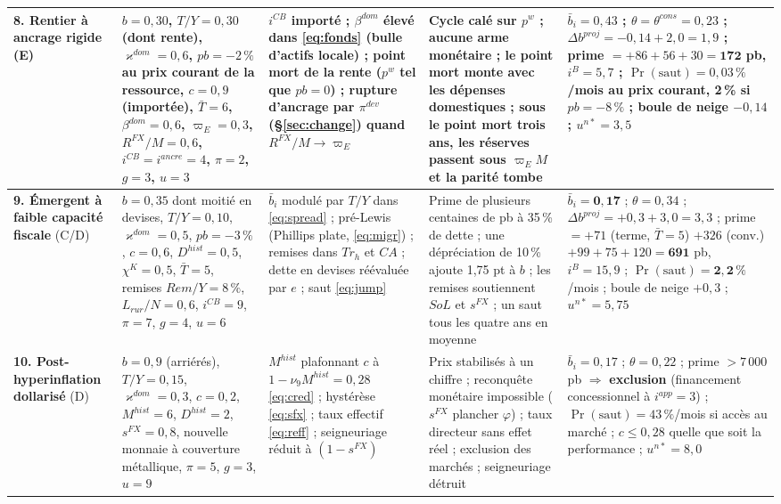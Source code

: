 \documentclass[11pt,a4paper]{article}
\begin{document}
\begin{center}
\begin{longtable}{p{1.6cm}p{3.1cm}p{3.4cm}p{2.9cm}p{3.5cm}}
\midrule
\textbf{8. Rentier à ancrage rigide} (E) & $b=0{,}30$, $T/Y=0{,}30$ (dont rente), $\varkappa^{dom}=0{,}6$, $pb=-2\,\%$ au prix courant de la ressource, $c=0{,}9$ (importée), $\bar T=6$, $\beta^{dom}=0{,}6$, $\varpi_E=0{,}3$, $R^{FX}/M=0{,}6$, $i^{CB}=i^{ancre}=4$, $\pi=2$, $g=3$, $u=3$ & $i^{CB}$ importé ; $\beta^{dom}$ élevé dans \eqref{eq:fonds} (bulle d'actifs locale) ; point mort de la rente ($p^w$ tel que $pb=0$) ; rupture d'ancrage par $\pi^{dev}$ (\S\ref{sec:change}) quand $R^{FX}/M\to\varpi_E$ & Cycle calé sur $p^w$ ; aucune arme monétaire ; le point mort monte avec les dépenses domestiques ; sous le point mort trois ans, les réserves passent sous $\varpi_E M$ et la parité tombe & $\bar b_i=0{,}43$ ; $\theta=\theta^{cons}=0{,}23$ ; $\Delta b^{proj}=-0{,}14+2{,}0=1{,}9$ ; prime $=+86+56+30=\mathbf{172}$ pb, $i^B=5{,}7$ ; $\Pr(\text{saut})=0{,}03\,\%$/mois au prix courant, 2\,\% si $pb=-8\,\%$ ; boule de neige $-0{,}14$ ; $u^{n\ast}=3{,}5$\\
\midrule
\textbf{9. Émergent à faible capacité fiscale} (C/D) & $b=0{,}35$ dont moitié en devises, $T/Y=0{,}10$, $\varkappa^{dom}=0{,}5$, $pb=-3\,\%$, $c=0{,}6$, $D^{hist}=0{,}5$, $\chi^K=0{,}5$, $\bar T=5$, remises $Rem/Y=8\,\%$, $L_{rur}/N=0{,}6$, $i^{CB}=9$, $\pi=7$, $g=4$, $u=6$ & $\bar b_i$ modulé par $T/Y$ dans \eqref{eq:spread} ; pré-Lewis (Phillips plate, \eqref{eq:migr}) ; remises dans $Tr_h$ et $CA$ ; dette en devises réévaluée par $e$ ; saut \eqref{eq:jump} & Prime de plusieurs centaines de pb à 35\,\% de dette ; une dépréciation de 10\,\% ajoute 1,75 pt à $b$ ; les remises soutiennent $SoL$ et $s^{FX}$ ; un saut tous les quatre ans en moyenne & $\bar b_i=\mathbf{0{,}17}$ ; $\theta=0{,}34$ ; $\Delta b^{proj}=+0{,}3+3{,}0=3{,}3$ ; prime $=+71$ (terme, $\bar T=5$) $+326$ (conv.) $+99+75+120=\mathbf{691}$ pb, $i^B=15{,}9$ ; $\Pr(\text{saut})=\mathbf{2{,}2\,\%}$/mois ; boule de neige $+0{,}3$ ; $u^{n\ast}=5{,}75$\\
\midrule
\textbf{10. Post-hyper\-inflation dollarisé} (D) & $b=0{,}9$ (arriérés), $T/Y=0{,}15$, $\varkappa^{dom}=0{,}3$, $c=0{,}2$, $M^{hist}=6$, $D^{hist}=2$, $s^{FX}=0{,}8$, nouvelle monnaie à couverture métallique, $\pi=5$, $g=3$, $u=9$ & $M^{hist}$ plafonnant $c$ à $1-\nu_9M^{hist}=0{,}28$ \eqref{eq:cred} ; hystérèse \eqref{eq:sfx} ; taux effectif \eqref{eq:reff} ; seigneuriage réduit à $(1-s^{FX})$ & Prix stabilisés à un chiffre ; reconquête monétaire impossible ($s^{FX}$ plancher $\varphi$) ; taux directeur sans effet réel ; exclusion des marchés ; seigneuriage détruit & $\bar b_i=0{,}17$ ; $\theta=0{,}22$ ; prime $>7\,000$ pb $\Rightarrow$ \textbf{exclusion} (financement concessionnel à $i^{app}=3$) ; $\Pr(\text{saut})=43\,\%$/mois si accès au marché ; $c\le0{,}28$ quelle que soit la performance ; $u^{n\ast}=8{,}0$\\
\bottomrule
\end{longtable}
\end{center}
\end{document}
